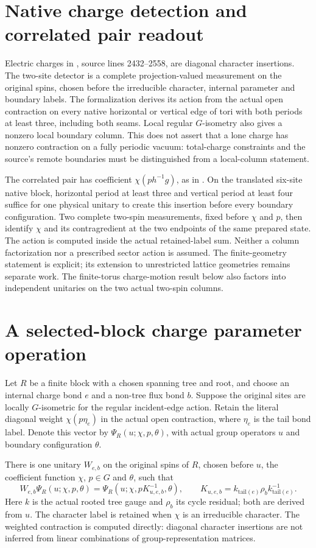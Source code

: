 \documentclass{article}
\begin{document}
\section{Native charge detection and correlated pair readout}
Electric charges in \cite[\S6.6]{Schuch2010PEPS}, source lines
2432--2558, are diagonal character insertions. The two-site detector
is a complete projection-valued measurement on the original spins,
chosen before the irreducible character, internal parameter and
boundary labels. The formalization derives its action from the actual
open contraction on every native horizontal or vertical edge of tori
with both periods at least three, including both seams. Local regular
$G$-isometry also gives a nonzero local boundary column. This does not
assert that a lone charge has nonzero contraction on a fully periodic
vacuum: total-charge constraints and the source's remote boundaries
must be distinguished from a local-column statement.

The correlated pair has coefficient $\chi(p h^{-1}g)$, as in
.
On the translated six-site native block, horizontal period at least
three and vertical period at least four suffice for one physical
unitary to create this insertion before every boundary configuration.
Two complete two-spin measurements, fixed before $\chi$ and $p$,
then identify $\chi$ and its contragredient at the two endpoints of
the same prepared state. The action is computed inside the actual
retained-label sum. Neither a column factorization nor a prescribed
sector action is assumed. The finite-geometry statement is explicit;
its extension to unrestricted lattice geometries remains separate work.
The finite-torus charge-motion result below also factors into independent
unitaries on the two actual two-spin columns.

\section{A selected-block charge parameter operation}
Let $R$ be a finite block with a chosen spanning tree and root, and choose
an internal charge bond $e$ and a non-tree flux bond $b$. Suppose the
original sites are locally $G$-isometric for the regular incident-edge
action. Retain the literal diagonal weight $\chi(p\eta_e)$ in the actual
open contraction, where $\eta_e$ is the tail bond label. Denote this vector
by $\Psi_R(u;\chi,p,\theta)$, with actual group operators $u$ and boundary
configuration $\theta$.

There is one unitary $W_{e,b}$ on the original spins of $R$, chosen before
$u$, the coefficient function $\chi$, $p\in G$ and $\theta$, such that
\[
 W_{e,b}\Psi_R(u;\chi,p,\theta)
   =\Psi_R(u;\chi,pK_{u,e,b}^{-1},\theta),\qquad
 K_{u,e,b}=k_{\mathrm{tail}(e)}\rho_bk_{\mathrm{tail}(e)}^{-1}.
\]
Here $k$ is the actual rooted tree gauge and $\rho_b$ its cycle residual;
both are derived from $u$. The character label is retained when $\chi$ is
an irreducible character. The weighted contraction is computed directly:
diagonal character insertions are not inferred from linear combinations
of group-representation matrices.
\end{document}
